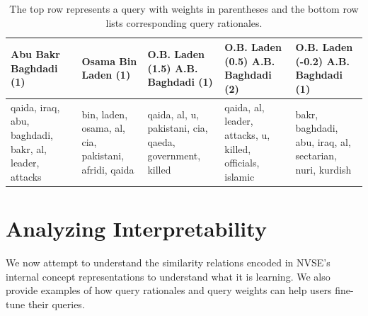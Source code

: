 \documentclass[a4paper]{article}
\newcommand{\nvge}{NVSE\xspace}
\begin{document}
\begin{table}[htbp]
  \vspace{-3pt}
  \renewcommand{\arraystretch}{0.8} %
  \linespread{0.9}\selectfont\centering
\centering
\begin{adjustbox}{width=\textwidth}
\begin{tabular}{|p{2.7cm}|p{2.67cm}|p{3cm}|p{2.9cm}|p{3cm}|}\hline
{ Abu Bakr Baghdadi (1)} & { Osama Bin Laden (1)} & { O.B. Laden (1.5)  A.B. Baghdadi (1)} & {  O.B. Laden (0.5)  A.B. Baghdadi (2)} & {  O.B. Laden (-0.2)  A.B. Baghdadi (1)} \\[-1pt]\hline
{ qaida, iraq, abu, baghdadi, bakr, al, leader, attacks} & { bin, laden, osama, al, cia, pakistani, afridi, qaida} & { qaida, al, u, pakistani, cia, qaeda, government, killed} &  { qaida, al, leader, attacks, u, killed, officials, islamic} & { bakr, baghdadi, abu, iraq, al, sectarian, nuri, kurdish} \\\hline
\end{tabular}
\end{adjustbox}
\caption{The top row represents a query with weights in parentheses and the bottom row lists corresponding
query rationales.} %
\label{tab:query-rational-weights}
\vspace{-6pt}
\end{table}

\section{Analyzing Interpretability}
We now attempt to understand the similarity relations encoded in \nvge's internal concept representations to understand what it is learning. We also provide examples of how query rationales and query weights can help users fine-tune their queries.
\end{document}
